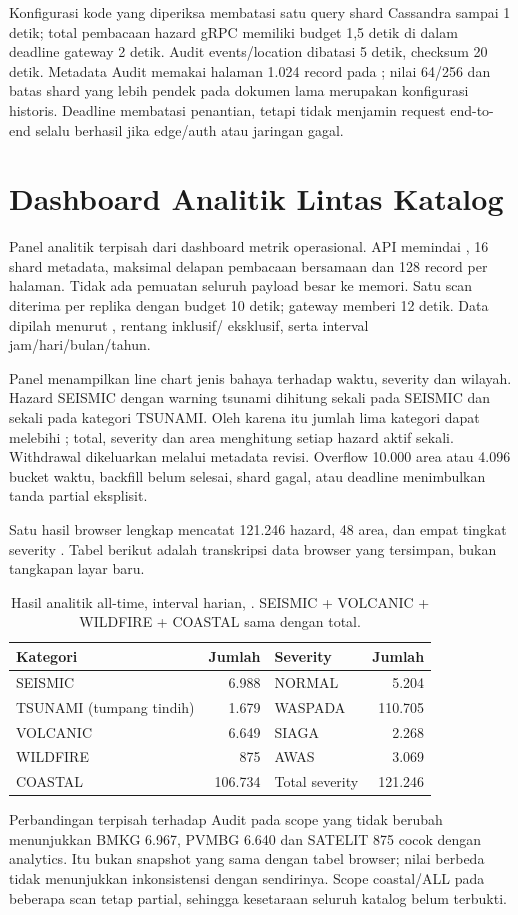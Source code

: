Konfigurasi kode yang diperiksa membatasi satu query shard Cassandra sampai 1 detik; total pembacaan hazard gRPC memiliki budget 1,5 detik di dalam deadline gateway 2 detik. Audit events/location dibatasi 5 detik, checksum 20 detik. Metadata Audit memakai halaman 1.024 record pada ; nilai 64/256 dan batas shard yang lebih pendek pada dokumen lama merupakan konfigurasi historis. Deadline membatasi penantian, tetapi tidak menjamin request end-to-end selalu berhasil jika edge/auth atau jaringan gagal.

\section{Dashboard Analitik Lintas Katalog}
Panel analitik terpisah dari dashboard metrik operasional. API memindai , 16 shard metadata, maksimal delapan pembacaan bersamaan dan 128 record per halaman. Tidak ada pemuatan seluruh payload besar ke memori. Satu scan diterima per replika dengan budget 10 detik; gateway memberi 12 detik. Data dipilah menurut , rentang  inklusif/ eksklusif, serta interval jam/hari/bulan/tahun.

Panel menampilkan line chart jenis bahaya terhadap waktu, severity dan wilayah. Hazard SEISMIC dengan warning tsunami dihitung sekali pada SEISMIC dan sekali pada kategori TSUNAMI. Oleh karena itu jumlah lima kategori dapat melebihi ; total, severity dan area menghitung setiap hazard aktif sekali. Withdrawal dikeluarkan melalui metadata revisi. Overflow 10.000 area atau 4.096 bucket waktu, backfill belum selesai, shard gagal, atau deadline menimbulkan tanda partial eksplisit.

Satu hasil browser lengkap mencatat 121.246 hazard, 48 area, dan empat tingkat severity . Tabel berikut adalah transkripsi data browser yang tersimpan, bukan tangkapan layar baru.
\begin{table}[htbp]\centering
\begin{tabular}{lrlr}\toprule
Kategori & Jumlah & Severity & Jumlah\\\midrule
SEISMIC & 6.988 & NORMAL & 5.204\\
TSUNAMI (tumpang tindih) & 1.679 & WASPADA & 110.705\\
VOLCANIC & 6.649 & SIAGA & 2.268\\
WILDFIRE & 875 & AWAS & 3.069\\
COASTAL & 106.734 & Total severity & 121.246\\\bottomrule
\end{tabular}
\caption{Hasil analitik all-time, interval harian, . SEISMIC + VOLCANIC + WILDFIRE + COASTAL sama dengan total.}
\end{table}
Perbandingan terpisah terhadap Audit pada scope yang tidak berubah menunjukkan BMKG 6.967, PVMBG 6.640 dan SATELIT 875 cocok dengan analytics. Itu bukan snapshot yang sama dengan tabel browser; nilai berbeda tidak menunjukkan inkonsistensi dengan sendirinya. Scope coastal/ALL pada beberapa scan tetap partial, sehingga kesetaraan seluruh katalog belum terbukti.

